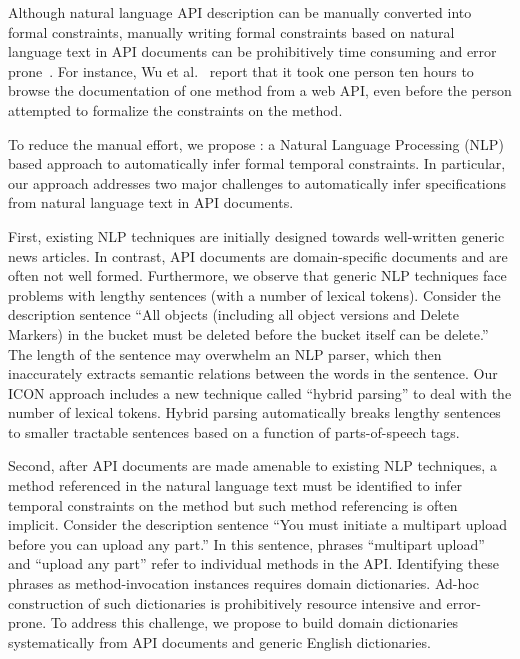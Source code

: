 Although natural language API description can be manually converted into formal constraints,
manually writing formal constraints based on natural language text in API documents can be prohibitively time consuming and error prone~\cite{wu2013inferring,RubingerWEB10}. 
For instance, Wu et al.~\cite{wu2013inferring} report that it took one person ten hours to browse the documentation of one method from a web API, even before the person attempted to formalize the constraints on the method.


To reduce the manual effort, we propose \tool: a Natural Language Processing (NLP) based approach
to automatically infer formal temporal constraints. 
In particular, our approach addresses two major challenges to automatically infer specifications
from natural language text in API documents.

First, existing NLP techniques are initially designed towards well-written generic news articles.
In contrast, API documents are domain-specific documents and are often not well formed.
Furthermore, we observe that generic NLP techniques face problems with lengthy sentences (with a number of lexical tokens).
Consider the description sentence ``All objects (including all object versions and Delete Markers) in the bucket must be deleted before the bucket itself can be delete.'' The length of the sentence may overwhelm an NLP parser, which then inaccurately extracts semantic relations between the words in the sentence.
Our ICON approach includes a new technique called ``hybrid parsing'' to deal with the number of lexical tokens.
Hybrid parsing automatically breaks lengthy sentences to smaller tractable sentences based on a function of parts-of-speech tags.   

Second, after API documents are made amenable to existing NLP techniques, a method referenced in the natural language text must be identified to infer temporal constraints on the method but such method referencing is often implicit.
Consider the description sentence ``You must initiate a multipart upload before you can upload any part.''
In this sentence, phrases ``multipart upload'' and ``upload any part'' refer to individual methods in the API.
Identifying these phrases as method-invocation instances requires domain dictionaries.
Ad-hoc construction of such dictionaries is prohibitively resource intensive and error-prone.
To address this challenge, we propose to build domain dictionaries systematically from API documents and generic English dictionaries.  

